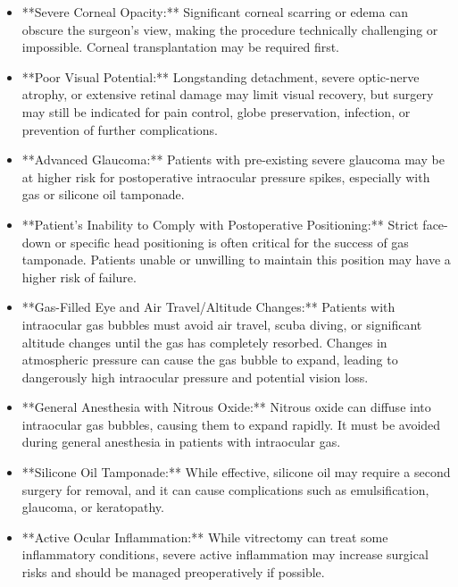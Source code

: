 \begin{itemize}
  \item **Severe Corneal Opacity:** Significant corneal scarring or edema can obscure the surgeon's view, making the procedure technically challenging or impossible. Corneal transplantation may be required first.
  
  \item **Poor Visual Potential:** Longstanding detachment, severe optic-nerve atrophy, or extensive retinal damage may limit visual recovery, but surgery may still be indicated for pain control, globe preservation, infection, or prevention of further complications.
  
  \item **Advanced Glaucoma:** Patients with pre-existing severe glaucoma may be at higher risk for postoperative intraocular pressure spikes, especially with gas or silicone oil tamponade.
  
  \item **Patient's Inability to Comply with Postoperative Positioning:** Strict face-down or specific head positioning is often critical for the success of gas tamponade. Patients unable or unwilling to maintain this position may have a higher risk of failure.
  
  \item **Gas-Filled Eye and Air Travel/Altitude Changes:** Patients with intraocular gas bubbles must avoid air travel, scuba diving, or significant altitude changes until the gas has completely resorbed. Changes in atmospheric pressure can cause the gas bubble to expand, leading to dangerously high intraocular pressure and potential vision loss.
  
  \item **General Anesthesia with Nitrous Oxide:** Nitrous oxide can diffuse into intraocular gas bubbles, causing them to expand rapidly. It must be avoided during general anesthesia in patients with intraocular gas.
  
  \item **Silicone Oil Tamponade:** While effective, silicone oil may require a second surgery for removal, and it can cause complications such as emulsification, glaucoma, or keratopathy.
  
  \item **Active Ocular Inflammation:** While vitrectomy can treat some inflammatory conditions, severe active inflammation may increase surgical risks and should be managed preoperatively if possible.
\end{itemize}

